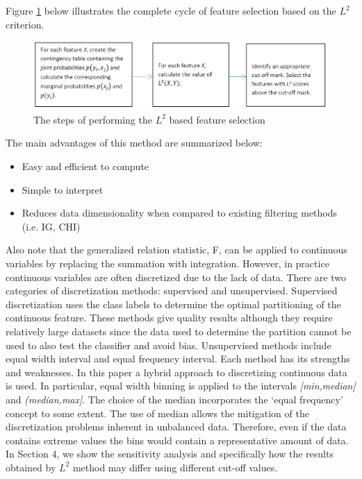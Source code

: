 \documentclass[review]{elsarticle}
\begin{document}
Figure \ref{fig:fig1} below illustrates the complete cycle of feature selection based on the $ L^2 $ criterion.\newline

\begin{figure}[h]
	\centering
	\includegraphics[width=0.9\linewidth]{figs/fig_1}
	\caption[short]{The steps of performing the $ L^2 $ based feature selection}
	\label{fig:fig1}
\end{figure}


The main advantages of this method are summarized below:
\begin{itemize}
	\item Easy and efficient to compute
	\item Simple to interpret 
	\item Reduces data dimensionality when compared to existing filtering methods (i.e. IG, CHI)
\end{itemize}


Also note that the generalized relation statistic, F, can be applied to continuous variables by replacing the summation with integration. However, in practice continuous variables are often discretized due to the lack of data. There are two categories of discretization methods: supervised and unsupervised. Supervised discretization uses the class labels to determine the optimal partitioning of the continuous feature. These methods give quality results although they require relatively large datasets since the data used to determine the partition cannot be used to also test the classifier and avoid bias. Unsupervised methods include equal width interval and equal frequency interval. Each method has its strengths and weaknesses. In this paper a hybrid approach to discretizing continuous data is used. In particular, equal width binning is applied to the intervals \textit{[min,median]} and \textit{(median,max]}. The choice of the median incorporates the ‘equal frequency’ concept to some extent. The use of median allows the mitigation of the discretization problems inherent in unbalanced data. Therefore, even if the data contains extreme values the bins would contain a representative amount of data. In Section 4, we show the sensitivity analysis and specifically how the results obtained by $ L^2 $ method may differ using different cut-off values.
\end{document}
